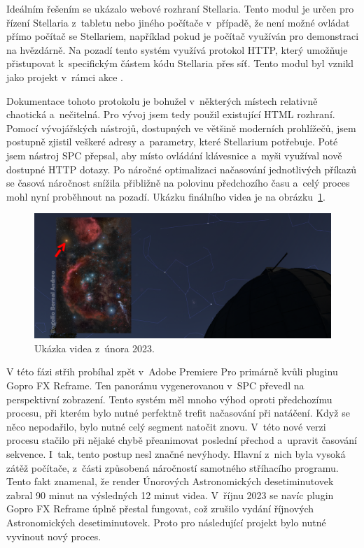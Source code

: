 \documentclass[12pt,a4paper,titlepage]{article}
\begin{document}
Ideálním řešením se ukázalo webové rozhraní Stellaria. Tento modul je určen pro řízení Stellaria z~tabletu nebo jiného počítače v~případě, že není možné ovládat přímo počítač se Stellariem, například pokud je počítač využíván pro demonstraci na hvězdárně. Na pozadí tento systém využívá protokol HTTP, který umožňuje přistupovat k~specifickým částem kódu Stellaria přes síť. Tento modul byl vznikl jako projekt v~rámci akce . 

Dokumentace tohoto protokolu je bohužel v~některých místech relativně chaotická a~nečitelná. Pro vývoj jsem tedy použil existující HTML rozhraní. Pomocí vývojářských nástrojů, dostupných ve většině moderních prohlížečů, jsem postupně zjistil veškeré adresy a~parametry, které Stellarium potřebuje. Poté jsem nástroj SPC přepsal, aby místo ovládání klávesnice a~myši využíval nově dostupné HTTP dotazy. Po náročné optimalizaci načasování jednotlivých příkazů se časová náročnost snížila přibližně na polovinu předchozího času a~celý proces mohl nyní proběhnout na pozadí. Ukázku finálního videa je na obrázku~\ref{img:unor}.

\begin{figure}[ht]
	\centering
	\includegraphics[width=.85\textwidth]{unor.png}
	\caption{Ukázka videa z~února 2023.}\label{img:unor}
\end{figure}

V této fázi střih probíhal zpět v~Adobe Premiere Pro primárně kvůli pluginu Gopro FX Reframe. Ten panorámu vygenerovanou v~SPC převedl na perspektivní zobrazení. Tento systém měl mnoho výhod oproti předchozímu procesu, při kterém bylo nutné perfektně trefit načasování při natáčení. Když se něco nepodařilo, bylo nutné celý segment natočit znovu. V~této nové verzi procesu stačilo při nějaké chybě přeanimovat poslední přechod a~upravit časování sekvence. I~tak, tento postup nesl značné nevýhody. Hlavní z~nich byla vysoká zátěž počítače, z~části způsobená náročností samotného stříhacího programu. Tento fakt znamenal, že render Únorových Astronomických desetiminutovek zabral 90 minut na výsledných 12 minut videa. V~říjnu 2023 se navíc plugin Gopro FX Reframe úplně přestal fungovat, což zrušilo vydání říjnových Astronomických desetiminutovek. Proto pro následující projekt bylo nutné vyvinout nový proces. 
\end{document}
